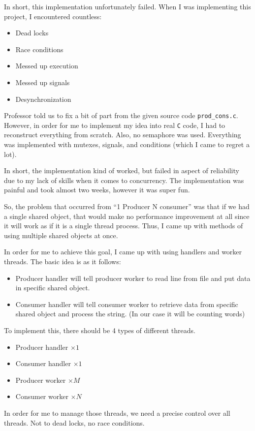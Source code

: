 \documentclass{homework}
\begin{document}
In short, this implementation unfortunately failed. When I was implementing this project, I encountered countless:
\begin{itemize}
    \item Dead locks
    \item Race conditions
    \item Messed up execution
    \item Messed up signals
    \item Desynchronization
\end{itemize}

Professor told us to fix a bit of part from the given source code \texttt{prod_cons.c}. However, in order for me to implement my idea into real \texttt{C} code, I had to reconstruct everything from scratch. Also, no semaphore was used. Everything was implemented with mutexes, signals, and conditions (which I came to regret a lot).

In short, the implementation kind of worked, but failed in aspect of reliability due to my lack of skills when it comes to concurrency. The implementation was painful and took almost two weeks, however it was super fun. 

So, the problem that occurred from “1 Producer N consumer” was that if we had a single shared object, that would make no performance improvement at all since it will work as if it is a single thread process. Thus, I came up with methods of using multiple shared objects at once.

In order for me to achieve this goal, I came up with using handlers and worker threads. The basic idea is as it follows:
\begin{itemize}
    \item Producer handler will tell producer worker to read line from file and put data in specific shared object. 
    \item Consumer handler will tell consumer worker to retrieve data from specific shared object and process the string. (In our case it will be counting words)
\end{itemize}
To implement this, there should be 4 types of different threads.
\begin{itemize}
    \item Producer handler $\times 1$
    \item Consumer handler $\times 1$
    \item Producer worker $\times M$
    \item Consumer worker $\times N$
\end{itemize}
In order for me to manage those threads, we need a precise control over all threads. Not to dead locks, no race conditions. 
\par
\end{document}
